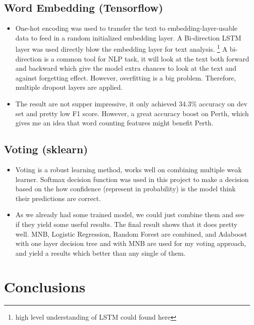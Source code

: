 \documentclass[11pt]{article}
\begin{document}
\subsection{Word Embedding (Tensorflow)}
\begin{itemize}
      \item One-hot encoding was used to transfer the text to embedding-layer-usable data to feed in a 
            random initialized embedding layer. A Bi-direction LSTM layer 
            was used directly blow the embedding layer for text analysis.
            \footnote{high level understanding of LSTM could found here }
            A bi-direction is a common tool for NLP task, it will look at the text both forward and 
            backward which give the model extra chances to look at the text and against forgetting effect.
            However, overfitting is a big problem. Therefore, multiple dropout layers are applied.
      \item The result are not supper impressive, it only achieved 34.3\% accuracy on dev set and pretty
            low F1 score. However, a great accuracy boost on Perth, which gives me an idea that word
            counting features might benefit Perth.
\end{itemize}

\subsection{Voting (sklearn)}
\begin{itemize}
      \item Voting is a robust learning method, works well on combining
            multiple weak learner. Softmax decision function was used in this project
            to make a decision based on the how confidence (represent in probability) 
            is the model think their predictions are correct.
      \item As we already had some trained model, we could just combine them and 
            see if they yield some useful results. The final result shows that it does
            pretty well. MNB, Logistic Regression, Random Forest are combined, and Adaboost with one layer
            decision tree and with MNB are used for my voting approach, 
            and yield a results which better than any single of them.
            
\end{itemize}

\section{Conclusions}
\end{document}
